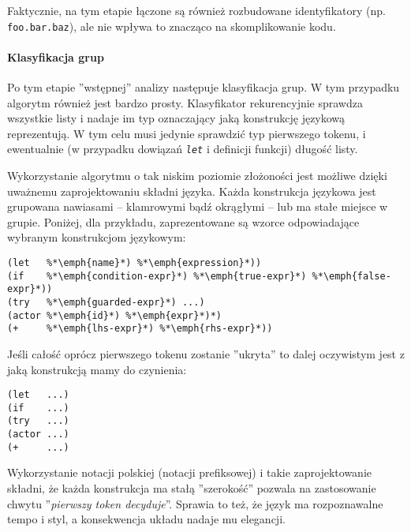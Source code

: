 Faktycznie, na tym etapie łączone są również rozbudowane identyfikatory (np. \texttt{foo.bar.baz}), ale nie
wpływa to znacząco na skomplikowanie kodu.

\paragraph*{Klasyfikacja grup}
Po tym etapie ''wstępnej'' analizy następuje klasyfikacja grup. W tym przypadku algorytm również jest bardzo
prosty. Klasyfikator rekurencyjnie sprawdza wszystkie listy i nadaje im typ oznaczający jaką konstrukcję
językową reprezentują. W tym celu musi jedynie sprawdzić typ pierwszego tokenu, i ewentualnie (w przypadku
dowiązań \emph{\texttt{let}} i definicji funkcji) długość listy.

Wykorzystanie algorytmu o tak niskim poziomie złożoności jest możliwe dzięki uważnemu zaprojektowaniu składni
języka. Każda konstrukcja językowa jest grupowana nawiasami -- klamrowymi bądź okrągłymi -- lub ma stałe
miejsce w grupie. Poniżej, dla przykładu, zaprezentowane są wzorce odpowiadające wybranym konstrukcjom
językowym:
\begin{lstlisting}
(let   %*\emph{name}*) %*\emph{expression}*))
(if    %*\emph{condition-expr}*) %*\emph{true-expr}*) %*\emph{false-expr}*))
(try   %*\emph{guarded-expr}*) ...)
(actor %*\emph{id}*) %*\emph{expr}*)*)
(+     %*\emph{lhs-expr}*) %*\emph{rhs-expr}*))
\end{lstlisting}

Jeśli całość oprócz pierwszego tokenu zostanie ''ukryta'' to dalej oczywistym jest z jaką konstrukcją mamy do
czynienia:
\begin{lstlisting}
(let   ...)
(if    ...)
(try   ...)
(actor ...)
(+     ...)
\end{lstlisting}

Wykorzystanie notacji polskiej (notacji prefiksowej) i takie zaprojektowanie składni, że każda konstrukcja ma
stałą ''szerokość'' pozwala na zastosowanie chwytu ''\emph{pierwszy token decyduje}''. Sprawia to też, że
język ma rozpoznawalne tempo i styl, a konsekwencja układu nadaje mu elegancji.
